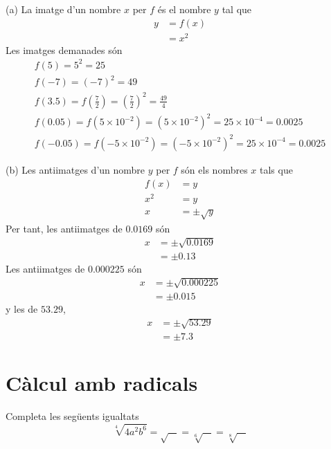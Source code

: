 \begin{solucio}
(a) La imatge d’un nombre $x$ per $f$ és el nombre $y$ tal que%
\begin{align*}
y &=f(x) \\
&=x^{2}
\end{align*}%
Les imatges demanades són%
\begin{equation*}
\begin{array}{l}
f(5)=5^{2}=25 \\ 
f(-7)=(-7)^{2}=49 \\ 
f(3.5)=f(\frac{7}{2})=\left( \frac{7}{2}\right) ^{2}=\frac{49}{4} \\ 
f(0.05)=f(5\times 10^{-2})=\left( 5\times 10^{-2}\right) ^{2}=25\times
10^{-4}=0.0025 \\ 
f(-0.05)=f(-5\times 10^{-2})=\left( -5\times 10^{-2}\right) ^{2}=25\times
10^{-4}=0.0025%
\end{array}%
\end{equation*}

(b) Les antiimatges d’un nombre $y$ per $f$ són els nombres $x$
tals que%
\begin{align*}
f(x) &=y \\
x^{2} &=y \\
x &=\pm \sqrt{y}
\end{align*}%
Per tant, les antiimatges de $0.0169$ són%
\begin{align*}
x &=\pm \sqrt{0.0169} \\
&=\pm 0.13
\end{align*}%
Les antiimatges de $0.000225$ són%
\begin{align*}
x &=\pm \sqrt{0.000225} \\
&=\pm 0.015
\end{align*}%
y les de $53.29$,%
\begin{align*}
x &=\pm \sqrt{53.29} \\
&=\pm 7.3
\end{align*}
\end{solucio}

\section{Càlcul amb radicals}

\begin{exercici}
Completa les següents igualtats%
\begin{equation*}
\sqrt[4]{4a^{2}b^{6}}=\sqrt{~~~~}=\sqrt[6]{~~~~}=\sqrt[8]{~\ ~~}
\end{equation*}

\end{exercici}

